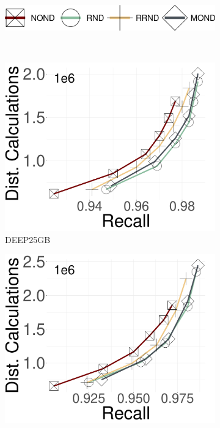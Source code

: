 \begin{figure}[h!]
	\captionsetup{justification=centering}
	\centering	
		\begin{subfigure}{\columnwidth}
			\centering
			\captionsetup{justification=centering}	
			\includegraphics[width=0.4\columnwidth]{../img/Experiments/RNG/legend.png}
			\label{fig:ND:legend}
		\end{subfigure}\\
		\begin{subfigure}{0.28\columnwidth}
			\centering
			\captionsetup{justification=centering}	
			\includegraphics[width=\textwidth]{../img/Experiments/RNG/DC_DEEP25GB.pdf}
		\caption{{DEEP25GB}}
		\label{fig:ND:deep25GB}	
		\end{subfigure}	
  \hspace{0.5cm}
		\begin{subfigure}{0.28\columnwidth}
			\centering
			\captionsetup{justification=centering}	
			\includegraphics[width=\textwidth]{../img/Experiments/RNG/DC_DEEP100GB.pdf}

\end{subfigure}
\end{figure}
